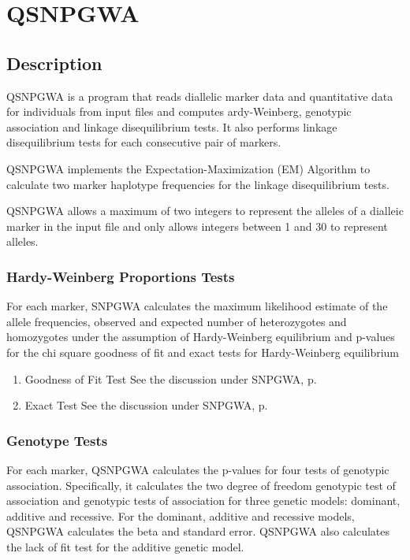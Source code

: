 
\section{QSNPGWA}
\label{sec:qsnpgwa}
\subsection{Description}

QSNPGWA is a program that reads diallelic marker data and quantitative data for
individuals from input files and computes ardy-Weinberg, genotypic association
and linkage disequilibrium tests.  It also performs linkage disequilibrium tests
for each consecutive pair of markers.

QSNPGWA implements the Expectation-Maximization (EM) Algorithm to calculate two
marker haplotype frequencies for the linkage disequilibrium tests.

QSNPGWA allows a maximum of two integers to represent the alleles of a dialleic
marker in the input file and only allows integers between 1 and 30 to represent
alleles.

\subsubsection{Hardy-Weinberg Proportions Tests}

For each marker, SNPGWA calculates the maximum likelihood estimate of the allele
frequencies, observed and expected number of heterozygotes and homozygotes under
the assumption of Hardy-Weinberg equilibrium and p-values for the chi square
goodness of fit and exact tests for Hardy-Weinberg equilibrium \cite{Guo92}

\begin{enumerate}

\item{Goodness of Fit Test}
See the discussion under SNPGWA, p.\pageref{goodness-of-fit}

\item{Exact Test}
See the discussion under SNPGWA, p.\pageref{exact-test}

\end{enumerate}

\subsubsection{Genotype Tests}
For each marker, QSNPGWA calculates the p-values for four tests of genotypic
association.  Specifically, it calculates the two degree of freedom genotypic
test of association and genotypic tests of association for three genetic models:
dominant, additive and recessive.  For the dominant, additive and recessive
models, QSNPGWA calculates the beta and standard error.  QSNPGWA also calculates
the lack of fit test for the additive genetic model.


